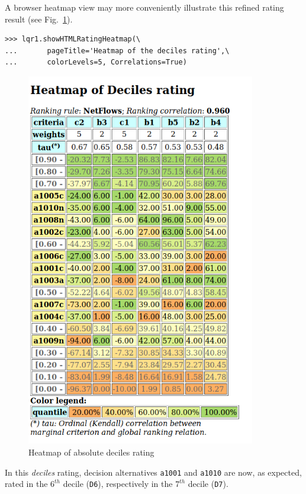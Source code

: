 A browser heatmap view may more conveniently illustrate this refined rating result (see Fig.~\ref{fig:10.4}).
\begin{lstlisting}
>>> lqr1.showHTMLRatingHeatmap(\
...       pageTitle='Heatmap of the deciles rating',\
...       colorLevels=5, Correlations=True)
\end{lstlisting}
\begin{figure}[h]
\includegraphics[width=10cm]{Figures/heatMap2.png}
\caption{Heatmap of absolute deciles rating}
\label{fig:10.4}       %
\end{figure}
\clearpage
In this \emph{deciles} rating, decision alternatives \texttt{a1001} and \texttt{a1010} are now, as expected, rated in the $6^{th}$ decile (\texttt{D6}), respectively in the $7^{th}$ decile (\texttt{D7}).

